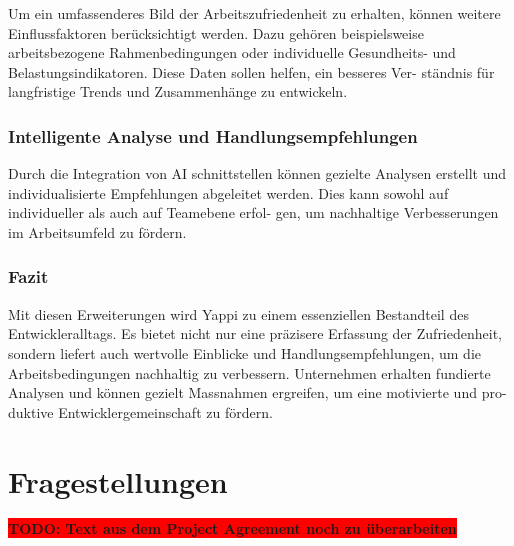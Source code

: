 \documentclass[12pt,a4paper]{report}
\newcommand{\todo}[1]{\colorbox{red}{\textbf{TODO: #1}}\\}
\begin{document}
Um ein umfassenderes Bild der Arbeitszufriedenheit zu erhalten, können weitere Einflussfaktoren
berücksichtigt werden. Dazu gehören beispielsweise arbeitsbezogene Rahmenbedingungen oder
individuelle Gesundheits- und Belastungsindikatoren. Diese Daten sollen helfen, ein besseres Ver-
ständnis für langfristige Trends und Zusammenhänge zu entwickeln.

\subsubsection{Intelligente Analyse und Handlungsempfehlungen}

Durch die Integration von AI schnittstellen können gezielte Analysen erstellt und individualisierte
Empfehlungen abgeleitet werden. Dies kann sowohl auf individueller als auch auf Teamebene erfol-
gen, um nachhaltige Verbesserungen im Arbeitsumfeld zu fördern.

\subsubsection{Fazit}

Mit diesen Erweiterungen wird Yappi zu einem essenziellen Bestandteil des Entwickleralltags. Es
bietet nicht nur eine präzisere Erfassung der Zufriedenheit, sondern liefert auch wertvolle Einblicke
und Handlungsempfehlungen, um die Arbeitsbedingungen nachhaltig zu verbessern. Unternehmen
erhalten fundierte Analysen und können gezielt Massnahmen ergreifen, um eine motivierte und pro-
duktive Entwicklergemeinschaft zu fördern.

\section{Fragestellungen}

\todo{Text aus dem Project Agreement noch zu überarbeiten}
\end{document}
